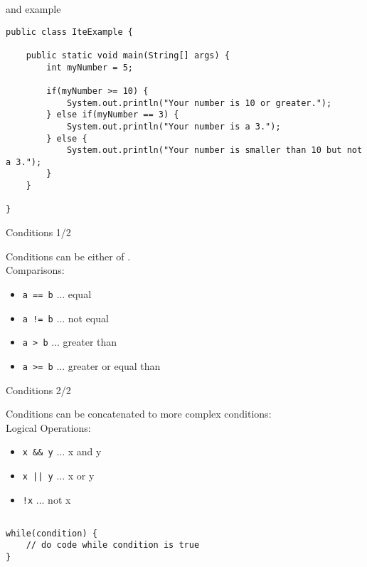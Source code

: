 \begin{frame}[fragile]{ and  example}
\begin{lstlisting}
public class IteExample {

    public static void main(String[] args) {
        int myNumber = 5;
        
        if(myNumber >= 10) {
            System.out.println("Your number is 10 or greater.");
        } else if(myNumber == 3) {
            System.out.println("Your number is a 3.");
        } else {
            System.out.println("Your number is smaller than 10 but not a 3.");
        }
    }
    
}\end{lstlisting}
\end{frame}

\begin{frame}{Conditions 1/2}

Conditions can be either  of .
\\[0.3in]

Comparisons:
\begin{itemize}
    \item \texttt{a == b} ... equal
    \item \texttt{a != b} ... not equal
    \item \texttt{a > b} ... greater than
    \item \texttt{a >= b} ... greater or equal than
\end{itemize}
\end{frame}

\begin{frame}{Conditions 2/2}

Conditions can be concatenated to more complex conditions:
\\[0.3in]

Logical Operations:
\begin{itemize}
    \item \texttt{x \&\& y} ... x and y
    \item \texttt{x || y} ... x or y
    \item \texttt{!x} ... not x
\end{itemize}
\end{frame}

\subsection{}
\begin{frame}[fragile]{}
\begin{lstlisting}
while(condition) {
    // do code while condition is true
}\end{lstlisting}
\end{frame}

